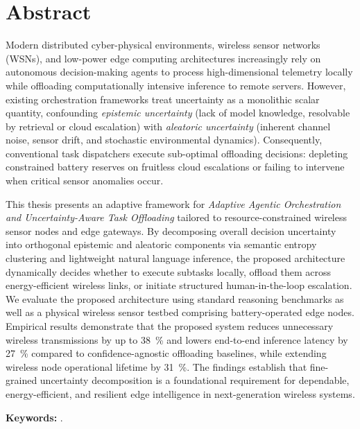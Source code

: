 \chapter*{Abstract}

Modern distributed cyber-physical environments, wireless sensor networks (WSNs), and low-power edge computing architectures increasingly rely on autonomous decision-making agents to process high-dimensional telemetry locally while offloading computationally intensive inference to remote servers. However, existing orchestration frameworks treat uncertainty as a monolithic scalar quantity, confounding \emph{epistemic uncertainty} (lack of model knowledge, resolvable by retrieval or cloud escalation) with \emph{aleatoric uncertainty} (inherent channel noise, sensor drift, and stochastic environmental dynamics). Consequently, conventional task dispatchers execute sub-optimal offloading decisions: depleting constrained battery reserves on fruitless cloud escalations or failing to intervene when critical sensor anomalies occur.

This thesis presents an adaptive framework for \emph{Adaptive Agentic Orchestration and Uncertainty-Aware Task Offloading} tailored to resource-constrained wireless sensor nodes and edge gateways. By decomposing overall decision uncertainty into orthogonal epistemic and aleatoric components via semantic entropy clustering and lightweight natural language inference, the proposed architecture dynamically decides whether to execute subtasks locally, offload them across energy-efficient wireless links, or initiate structured human-in-the-loop escalation. We evaluate the proposed architecture using standard reasoning benchmarks as well as a physical wireless sensor testbed comprising battery-operated edge nodes. Empirical results demonstrate that the proposed system reduces unnecessary wireless transmissions by up to \SI{38}{\percent} and lowers end-to-end inference latency by \SI{27}{\percent} compared to confidence-agnostic offloading baselines, while extending wireless node operational lifetime by \SI{31}{\percent}. The findings establish that fine-grained uncertainty decomposition is a foundational requirement for dependable, energy-efficient, and resilient edge intelligence in next-generation wireless systems.

\vspace{0.8cm}
\noindent\textbf{Keywords:} \ThesisKeywords.

\vfill
\newpage

